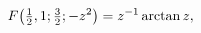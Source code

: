\[\mathop{F\/}\nolimits\!\left(\tfrac{1}{2},1;\tfrac{3}{2};-z^{2}\right)=z^{-1}%
\mathop{\mathrm{arctan}\/}\nolimits z,\]